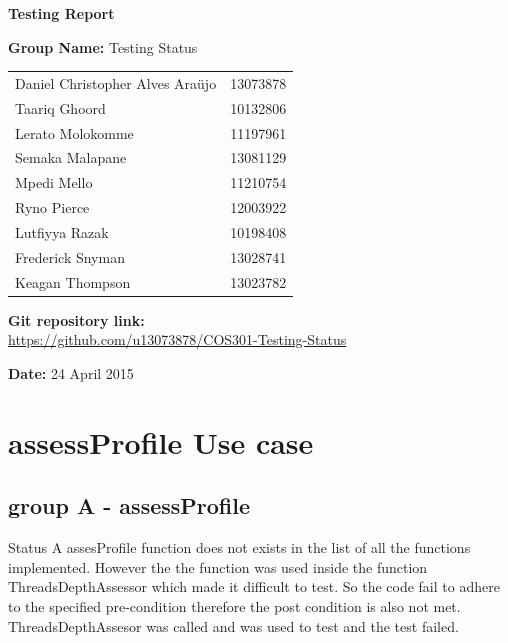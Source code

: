\documentclass[a4paper,12pt]{article}
\begin{document}
\begin{center}

\Huge\textbf{Testing Report\\}
																											
\vspace{2 cm}

\LARGE\textbf{Group Name:} Testing Status\newline
 
\vspace{0.5 cm}
\begin{tabular}{lr}
Daniel Christopher Alves Ara\"{u}jo&13073878\\ 
Taariq Ghoord&10132806\\
Lerato Molokomme&11197961\\
Semaka Malapane&13081129\\
Mpedi Mello&11210754\\
Ryno Pierce&12003922\\
Lutfiyya Razak&10198408\\
Frederick Snyman&13028741\\
Keagan Thompson&13023782\\
\end{tabular}

\vspace{1cm}
\textbf{Git repository link:\\}
\url{https://github.com/u13073878/COS301-Testing-Status}

\vspace{1cm}
\textbf{Date:} 24 April 2015
\end{center}
\newpage

\tableofcontents
{}
\newpage


\section{assessProfile Use case}
\subsection{group A - assessProfile}
Status A assesProfile function does not exists in the list of all the functions implemented. However the the function was used
inside the function ThreadsDepthAssessor which made it difficult to test. So the code fail to adhere to the specified pre-condition 
therefore  the post condition is also not met. ThreadsDepthAssesor was called and was used to test and the test failed.
\end{document}
